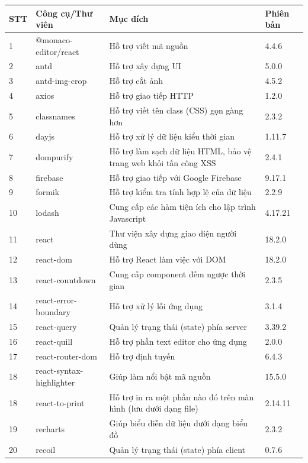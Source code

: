 \documentclass[../DoAn.tex]{subfiles}
\begin{document}
\begin{longtable}{|p{}|p{}|p{}|p{}|}
\hline
\textbf{STT} & \textbf{Công cụ/Thư viên} & \textbf{Mục đích} & \textbf{Phiên bản}  \\ \hline
1 & @monaco-editor/react & Hỗ trợ viết mã nguồn & 4.4.6 \\ \hline
2 & antd & Hỗ trợ xây dựng UI & 5.0.0 \\ \hline
3 & antd-img-crop & Hỗ trợ cắt ảnh & 4.5.2 \\ \hline
4 & axios & Hỗ trợ giao tiếp HTTP & 1.2.0 \\ \hline
5 & classnames & Hỗ trợ viết tên class (CSS) gọn gàng hơn & 2.3.2 \\ \hline
6 & dayjs & Hỗ trợ xử lý dữ liệu kiểu thời gian & 1.11.7 \\ \hline
7 & dompurify & Hỗ trợ làm sạch dữ liệu HTML, bảo vệ trang web khỏi tấn công XSS & 2.4.1 \\ \hline
8 & firebase & Hỗ trợ giao tiếp với Google Firebase & 9.17.1 \\ \hline
9 & formik & Hỗ trợ kiểm tra tính hợp lệ của dữ liệu  & 2.2.9 \\ \hline
10 & lodash & Cung cấp các hàm tiện ích cho lập trình Javascript  & 4.17.21 \\ \hline
11 & react & Thư viện xây dựng giao diện người dùng & 18.2.0 \\ \hline
12 & react-dom & Hỗ trợ React làm việc với DOM & 18.2.0 \\ \hline
13 & react-countdown & Cung cấp component đếm ngược thời gian & 2.3.5 \\ \hline
14 & react-error-boundary & Hỗ trợ xử lý lỗi ứng dụng & 3.1.4 \\ \hline
15 & react-query & Quản lý trạng thái (state) phía server & 3.39.2 \\ \hline
16 & react-quill & Hỗ trợ phần text editor cho ứng dụng & 2.0.0 \\ \hline
17 & react-router-dom & Hỗ trợ định tuyến & 6.4.3 \\ \hline
18 & react-syntax-highlighter & Giúp làm nổi bật mã nguồn & 15.5.0 \\ \hline
18 & react-to-print & Hỗ trợ in ra một phần nào đó trên màn hình (lưu dưới dạng file) & 2.14.11 \\ \hline
19 & recharts & Giúp biểu diễn dữ liệu dưới dạng biểu đồ & 2.3.2 \\ \hline
20 & recoil & Quản lý trạng thái (state) phía client & 0.7.6 \\ \hline

\end{longtable}
\end{document}
